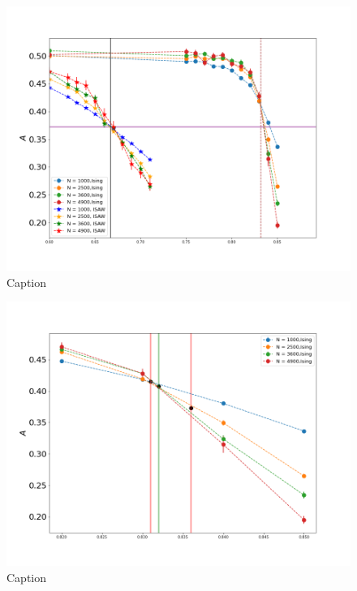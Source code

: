 \documentclass[aps,pre,amssymb,amsmath,twocolumn,floatfix]{revtex4-2}
\begin{document}

\begin{figure}[h]
    \centering
    \includegraphics[width=\columnwidth]{Images/Ising_ISAW_A_J_Full.png}
    \caption{Caption}
    \label{fig:my_label}
\end{figure}

\begin{figure}[h]
    \centering
    \includegraphics[width=\columnwidth]{Images/Ising_A_J_Close.png}
    \caption{Caption}
    \label{fig:my_label}
\end{figure}
\end{document}

